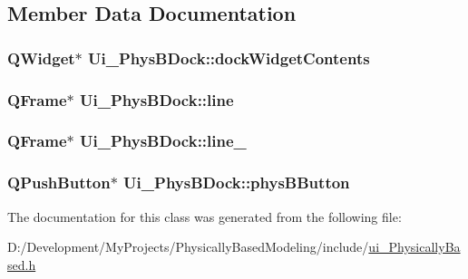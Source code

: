\subsection{Member Data Documentation}
\hypertarget{class_ui___phys_b_dock_afb820b26a533843d9c568c6c91df0021}{
\subsubsection[{dock\-Widget\-Contents}]{\setlength{\rightskip}{0pt plus 5cm}Q\-Widget$\ast$ Ui\-\_\-\-Phys\-B\-Dock\-::dock\-Widget\-Contents}}\label{class_ui___phys_b_dock_afb820b26a533843d9c568c6c91df0021}
\hypertarget{class_ui___phys_b_dock_ac5cc5c7e3a4d3c418afac6754b5e2824}{
\subsubsection[{line}]{\setlength{\rightskip}{0pt plus 5cm}Q\-Frame$\ast$ Ui\-\_\-\-Phys\-B\-Dock\-::line}}\label{class_ui___phys_b_dock_ac5cc5c7e3a4d3c418afac6754b5e2824}
\hypertarget{class_ui___phys_b_dock_a37156c5e0a99eee9ffc0bbf3aae14289}{
\subsubsection[{line\-\_\-2}]{\setlength{\rightskip}{0pt plus 5cm}Q\-Frame$\ast$ Ui\-\_\-\-Phys\-B\-Dock\-::line\-\_}}\label{class_ui___phys_b_dock_a37156c5e0a99eee9ffc0bbf3aae14289}
\hypertarget{class_ui___phys_b_dock_a011f24bbe2ada22ad04c4da81c72c3b1}{
\subsubsection[{phys\-B\-Button}]{\setlength{\rightskip}{0pt plus 5cm}Q\-Push\-Button$\ast$ Ui\-\_\-\-Phys\-B\-Dock\-::phys\-B\-Button}}\label{class_ui___phys_b_dock_a011f24bbe2ada22ad04c4da81c72c3b1}


The documentation for this class was generated from the following file\-:\begin{DoxyCompactItemize}
\item 
D\-:/\-Development/\-My\-Projects/\-Physically\-Based\-Modeling/include/\hyperlink{ui___physically_based_8h}{ui\-\_\-\-Physically\-Based.\-h}\end{DoxyCompactItemize}

